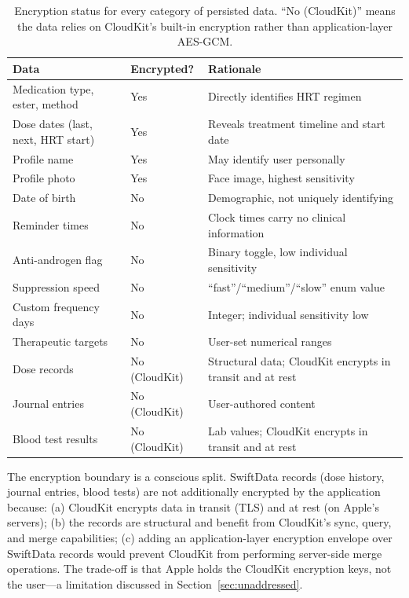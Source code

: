 \documentclass[11pt,a4paper]{article}
\begin{document}
\begin{table}[h]
\centering
\small
\begin{tabular}{@{}p{3.8cm}p{1.8cm}p{8.9cm}@{}}
\toprule
\textbf{Data} & \textbf{Encrypted?} & \textbf{Rationale} \\
\midrule
Medication type, ester, method & Yes &
  Directly identifies HRT regimen \\
Dose dates (last, next, HRT start) & Yes &
  Reveals treatment timeline and start date \\
Profile name & Yes &
  May identify user personally \\
Profile photo & Yes &
  Face image, highest sensitivity \\
Date of birth & No &
  Demographic, not uniquely identifying \\
Reminder times & No &
  Clock times carry no clinical information \\
Anti-androgen flag & No &
  Binary toggle, low individual sensitivity \\
Suppression speed & No &
  ``fast''/``medium''/``slow'' enum value \\
Custom frequency days & No &
  Integer; individual sensitivity low \\
Therapeutic targets & No &
  User-set numerical ranges \\
Dose records & No (CloudKit) &
  Structural data; CloudKit encrypts in transit and at rest \\
Journal entries & No (CloudKit) &
  User-authored content \\
Blood test results & No (CloudKit) &
  Lab values; CloudKit encrypts in transit and at rest \\
\bottomrule
\end{tabular}
\caption{Encryption status for every category of persisted data. ``No
(CloudKit)'' means the data relies on CloudKit's built-in encryption rather
than application-layer AES-GCM.}
\label{tab:encryption}
\end{table}

The encryption boundary is a conscious split. SwiftData records (dose
history, journal entries, blood tests) are not additionally encrypted by the
application because: (a) CloudKit encrypts data in transit (TLS) and at rest
(on Apple's servers); (b) the records are structural and benefit from
CloudKit's sync, query, and merge capabilities; (c) adding an
application-layer encryption envelope over SwiftData records would prevent
CloudKit from performing server-side merge operations. The trade-off is that
Apple holds the CloudKit encryption keys, not the user---a limitation
discussed in Section~\ref{sec:unaddressed}.
\end{document}
